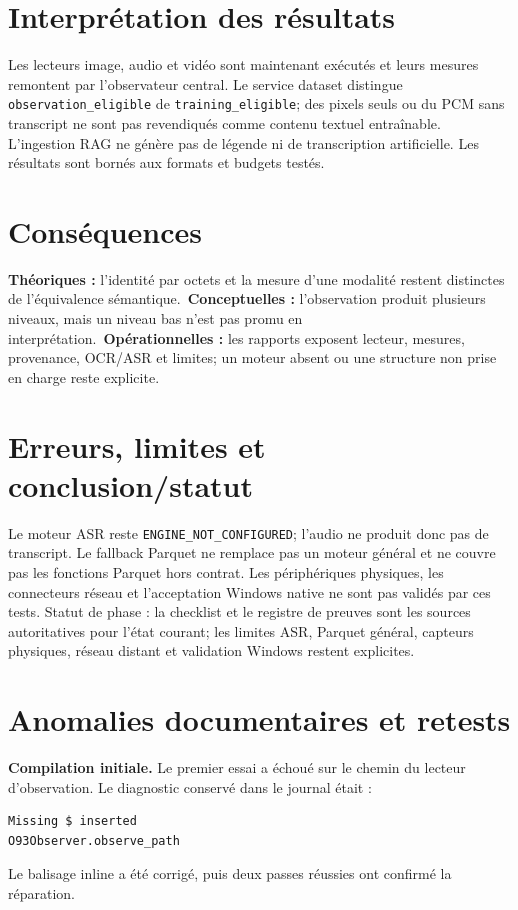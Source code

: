 \documentclass[11pt,a4paper]{report}
\begin{document}
\section{Interprétation des résultats}
Les lecteurs image, audio et vidéo sont maintenant exécutés et leurs mesures remontent par l'observateur central. Le service dataset distingue \texttt{observation\_eligible} de \texttt{training\_eligible}; des pixels seuls ou du PCM sans transcript ne sont pas revendiqués comme contenu textuel entraînable. L'ingestion RAG ne génère pas de légende ni de transcription artificielle. Les résultats sont bornés aux formats et budgets testés.
\section{Conséquences}
\textbf{Théoriques :} l'identité par octets et la mesure d'une modalité restent distinctes de l'équivalence sémantique.\
\textbf{Conceptuelles :} l'observation produit plusieurs niveaux, mais un niveau bas n'est pas promu en interprétation.\
\textbf{Opérationnelles :} les rapports exposent lecteur, mesures, provenance, OCR/ASR et limites; un moteur absent ou une structure non prise en charge reste explicite.
\section{Erreurs, limites et conclusion/statut}
Le moteur ASR reste \texttt{ENGINE\_NOT\_CONFIGURED}; l'audio ne produit donc pas de transcript. Le fallback Parquet ne remplace pas un moteur général et ne couvre pas les fonctions Parquet hors contrat. Les périphériques physiques, les connecteurs réseau et l'acceptation Windows native ne sont pas validés par ces tests. Statut de phase : la checklist et le registre de preuves sont les sources autoritatives pour l'état courant; les limites ASR, Parquet général, capteurs physiques, réseau distant et validation Windows restent explicites.

\section{Anomalies documentaires et retests}
\textbf{Compilation initiale.} Le premier essai a échoué sur le chemin du lecteur d'observation. Le diagnostic conservé dans le journal était :
\begin{lstlisting}
Missing $ inserted
O93Observer.observe_path
\end{lstlisting}
Le balisage inline a été corrigé, puis deux passes réussies ont confirmé la réparation.
\end{document}
